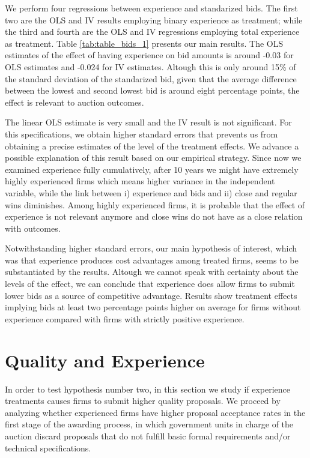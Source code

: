 We perform four regressions between experience and standarized bids. The first two are the OLS and IV results employing binary experience as treatment; while the third and fourth are the OLS and IV regressions employing total experience as treatment. Table \ref{tab:table_bids_1} presents our main results. The OLS estimates of the effect of having experience on bid amounts is around -0.03 for OLS estimates and -0.024 for IV estimates. Altough this is only around 15\% of the standard deviation of the standarized bid, given that the average difference between the lowest and second lowest bid is around eight percentage points, the effect is relevant to auction outcomes.

The linear OLS estimate is very small and the IV result is not significant. For this specifications, we obtain higher standard errors that prevents us from obtaining a precise estimates of the level of the treatment effects. We advance a possible explanation of this result based on our empirical strategy. Since now we examined experience fully cumulatively, after 10 years we might have extremely highly experienced firms which means higher variance in the independent variable, while the link between i) experience and bids and ii) close and regular wins diminishes. Among highly experienced firms, it is probable that the effect of experience is not relevant anymore and close wins do not have as a close relation with outcomes.



Notwithstanding higher standard errors, our main hypothesis of interest, which was that experience produces cost advantages among treated firms, seems to be substantiated by the results. Altough we cannot speak with certainty about the levels of the effect, we can conclude that experience does allow firms to submit lower bids as a source of competitive advantage. Results show treatment effects implying bids at least two percentage points higher on average for firms without experience compared with firms with strictly positive experience.


\section{Quality and Experience}
\label{section:qualityexp}
In order to test hypothesis number two, in this section we study if experience treatments causes firms to submit higher quality proposals. We proceed by analyzing whether experienced firms have higher proposal acceptance rates in the first stage of the awarding process, in which government units in charge of the auction discard proposals that do not fulfill basic formal requirements and/or technical specifications.

